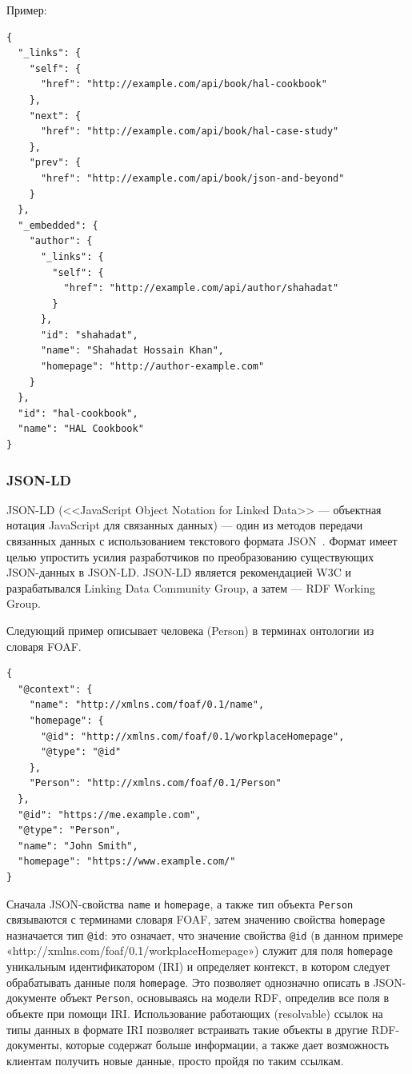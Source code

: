 \documentclass[a4page]{article}
\begin{document}
\newpage
Пример:

\begin{lstlisting}
{
  "_links": {
    "self": {
      "href": "http://example.com/api/book/hal-cookbook"
    },
    "next": {
      "href": "http://example.com/api/book/hal-case-study"
    },
    "prev": {
      "href": "http://example.com/api/book/json-and-beyond"
    }
  },
  "_embedded": {
    "author": {
      "_links": {
        "self": {
          "href": "http://example.com/api/author/shahadat"
        }
      },
      "id": "shahadat",
      "name": "Shahadat Hossain Khan",
      "homepage": "http://author-example.com"
    }
  },
  "id": "hal-cookbook",
  "name": "HAL Cookbook"
}
\end{lstlisting}

\subsubsection{JSON-LD}
JSON-LD (<<JavaScript Object Notation for Linked Data>> ---
объектная нотация JavaScript для связанных данных) ---
один из методов передачи связанных данных с использованием текстового формата JSON~\cite{json-ld}.
Формат имеет целью упростить усилия разработчиков по преобразованию существующих JSON-данных в JSON-LD.
JSON-LD является рекомендацией W3C и разрабатывался Linking Data Community Group,
а затем --- RDF Working Group.

Следующий пример описывает человека (Person) в терминах онтологии из словаря FOAF.
\begin{lstlisting}
{
  "@context": {
    "name": "http://xmlns.com/foaf/0.1/name",
    "homepage": {
      "@id": "http://xmlns.com/foaf/0.1/workplaceHomepage",
      "@type": "@id"
    },
    "Person": "http://xmlns.com/foaf/0.1/Person"
  },
  "@id": "https://me.example.com",
  "@type": "Person",
  "name": "John Smith",
  "homepage": "https://www.example.com/"
}
\end{lstlisting}

Сначала JSON-свойства \texttt{name} и \texttt{homepage},
а также тип объекта \texttt{Person} связываются с терминами словаря FOAF,
затем значению свойства \texttt{homepage} назначается тип \texttt{@id}:
это означает, что значение свойства \texttt{@id}
(в данном примере «http://xmlns.com/foaf/0.1/workplaceHomepage»)
служит для поля \texttt{homepage} уникальным идентификатором (IRI) и определяет контекст,
в котором следует обрабатывать данные поля \texttt{homepage}.
Это позволяет однозначно описать в JSON-документе объект \texttt{Person},
основываясь на модели RDF, определив все поля в объекте при помощи IRI.
Использование работающих (resolvable) ссылок на типы данных в формате IRI
позволяет встраивать такие объекты в другие RDF-документы, которые содержат больше информации,
а также дает возможность клиентам получить новые данные, просто пройдя по таким ссылкам.
\end{document}

